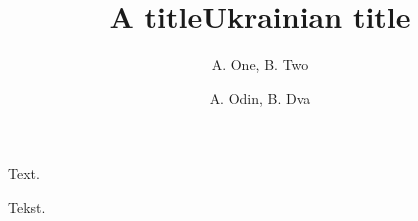\documentclass{article}
\title{A title}
\author{A. One\refaddr{la}, B. Two\refaddr{lb}}
\begin{document}
\maketitle
Text.
\ukrainianpart
\title{Ukrainian title}
\author{A. Odin, B. Dva}
\makeukrtitle
Tekst.
\end{document}

